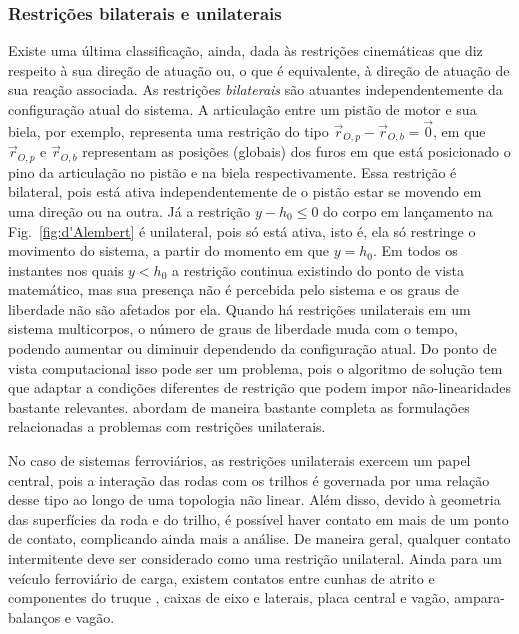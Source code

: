 \subsubsection{Restrições bilaterais e unilaterais} Existe uma última classificação, ainda, dada às restrições cinemáticas que diz respeito à sua direção de atuação ou, o que é equivalente, à direção de atuação de sua reação associada. As restrições \textit{bilaterais} são atuantes independentemente da configuração atual do sistema. A articulação entre um pistão de motor e sua biela, por exemplo, representa uma restrição do tipo $\vec{r}_{O,p} - \vec{r}_{O,b} = \vec{0}$, em que $\vec{r}_{O,p}$ e $\vec{r}_{O,b}$  representam as posições (globais) dos furos em que está posicionado o pino da articulação no pistão e na biela respectivamente. Essa restrição é bilateral, pois está ativa independentemente de o pistão estar se movendo em uma direção ou na outra. Já a restrição $y-h_0 \leq 0$ do corpo em lançamento na Fig.~\ref{fig:d'Alembert} é unilateral, pois só está ativa, isto é, ela só restringe o movimento do sistema, a partir do momento em que $y = h_0$. Em todos os instantes nos quais $y < h_0$ a restrição continua existindo do ponto de vista matemático, mas sua presença não é percebida pelo sistema e os 
graus de liberdade não são afetados por ela. Quando há restrições unilaterais em um sistema multicorpos, o número de graus de liberdade muda com o tempo, podendo aumentar ou diminuir dependendo da configuração atual. Do ponto de vista computacional isso pode ser um problema, pois o algoritmo de solução tem que adaptar a condições diferentes de restrição que podem impor não-linearidades bastante relevantes.  abordam de maneira bastante completa as formulações relacionadas a problemas com restrições unilaterais.

No caso de sistemas ferroviários, as restrições unilaterais exercem um papel central, pois a interação das rodas com os trilhos é governada por uma relação desse tipo ao longo de uma topologia não linear. Além disso, devido à geometria das superfícies da roda e do trilho, é possível haver contato em mais de um ponto de contato, complicando ainda mais a análise. De maneira geral, qualquer contato intermitente deve ser considerado como uma restrição unilateral. Ainda para um veículo ferroviário de carga, existem contatos entre cunhas de atrito e componentes do truque \cite{baruffaldi_aplicacao_2010,kaiser_modeling_2002}, caixas de eixo e laterais, placa central e vagão, ampara-balanços e vagão.

